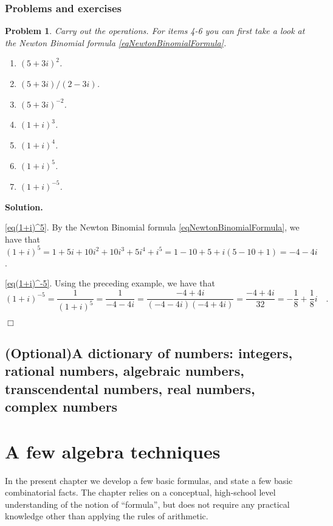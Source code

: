 \documentclass[12pt]{book}
\newenvironment{solution}{\textbf{Solution.} }{$\Box$}
\newtheorem{problem}{Problem}[section]
\newcommand{\optionalMaterial}{\textbf{(Optional)}}
\begin{document}
\subsection{Problems and exercises}
\begin{problem}\label{probComplexNumbersBasicOperations}
Carry out the operations. For items 4-6 you can first take a look at the Newton Binomial formula \eqref{eqNewtonBinomialFormula}.
\begin{multicols}{3}
\begin{enumerate}
\item $(5+3i)^2$.
\item $(5+3i)/(2-3i)$.
\item $(5+3i)^{-2}$.
\item $(1+i)^3$.
\item $(1+i)^4$.
\item \label{eq(1+i)^5} $(1+i)^5$.
\item \label{eq(1+i)^-5} $(1+i)^{-5}$.
\end{enumerate}
\end{multicols}
\end{problem}
\begin{solution}

\ref{eq(1+i)^5}.
By the Newton Binomial formula  \eqref{eqNewtonBinomialFormula}, we have that $(1+i)^5= 1 + 5i + 10 i^2+ 10i^3+5i^4+i^5= 1-10+5 +i(5-10+1)=-4-4i$.

\ref{eq(1+i)^-5}. Using the preceding example, we have that \[
(1+i)^{-5}=\frac{1}{(1+i)^5}=\frac{1}{ -4-4i}=\frac{-4+4i}{(-4-4i)(-4+4i)}=\frac{-4+4i}{32}=-\frac{1}{8}+\frac{1}{8}i\quad .
\]

\end{solution}
\section[\optionalMaterial A dictionary of numbers]{\optionalMaterial A dictionary of numbers: integers, rational numbers, algebraic numbers, transcendental numbers, real numbers, complex numbers}
\chapter{A few algebra techniques}
In the present chapter we develop a few basic formulas, and state a few basic combinatorial facts. The chapter relies on a conceptual, high-school level understanding of the notion of ``formula'', but does not require any practical knowledge other than applying the rules of arithmetic.
\end{document}
